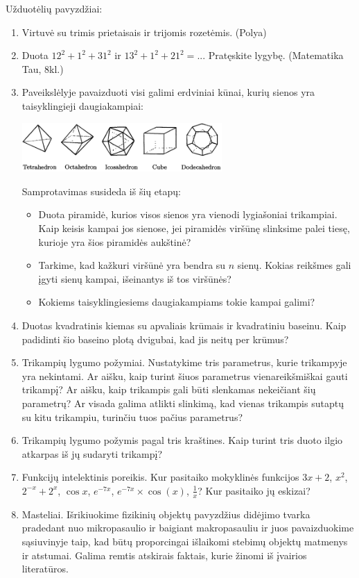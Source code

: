 \documentclass[a4paper]{article}
\begin{document}
Užduotėlių pavyzdžiai:
\begin{enumerate}
\item Virtuvė su trimis prietaisais ir trijomis rozetėmis. (Polya)
\item Duota $12^2+1^2+31^2$ ir $13^2+1^2+21^2=...$ Pratęskite lygybę. (Matematika Tau, 8kl.)
\item Paveikslėlyje pavaizduoti visi galimi erdviniai kūnai, kurių sienos yra taisyklingieji daugiakampiai:

\includegraphics[width=0.6\textwidth]{edrai.png}

Samprotavimas susideda iš šių etapų:
\begin{itemize}
\item Duota piramidė, kurios visos sienos yra vienodi lygiašoniai trikampiai. Kaip keisis kampai jos sienose, jei piramidės viršūnę slinksime palei tiesę, kurioje yra šios piramidės aukštinė?
\item Tarkime, kad kažkuri viršūnė yra bendra su $n$ sienų. Kokias reikšmes gali įgyti sienų kampai, išeinantys iš tos viršūnės?
\item Kokiems taisyklingiesiems daugiakampiams tokie kampai galimi?
\end{itemize}
\item Duotas kvadratinis kiemas su apvaliais krūmais ir kvadratiniu baseinu. Kaip padidinti šio baseino plotą dvigubai, kad jis neitų per krūmus?
\item Trikampių lygumo požymiai. Nustatykime tris parametrus, kurie trikampyje yra nekintami. Ar aišku, kaip turint šiuos parametrus vienareikšmiškai gauti trikampį? Ar aišku, kaip trikampis gali būti slenkamas nekeičiant šių parametrų? Ar visada galima atlikti slinkimą, kad vienas trikampis sutaptų su kitu trikampiu, turinčiu tuos pačius parametrus?
\item Trikampių lygumo požymis pagal tris kraštines. Kaip turint tris duoto ilgio atkarpas iš jų sudaryti trikampį?
\item Funkcijų intelektinis poreikis. Kur pasitaiko mokyklinės funkcijos $3x+2$, $x^2$, $2^{-x}+2^x$, $\cos x$, $e^{-7x}$, $e^{-7x}\times \cos(x)$, $\frac{1}{x}$? Kur pasitaiko jų eskizai?
\item Masteliai. Išrikiuokime fizikinių objektų pavyzdžius didėjimo tvarka pradedant nuo mikropasaulio ir baigiant makropasauliu ir juos pavaizduokime sąsiuvinyje taip, kad būtų proporcingai išlaikomi stebimų objektų matmenys ir atstumai. Galima remtis atskirais faktais, kurie žinomi iš įvairios literatūros. 


\end{enumerate}
\end{document}
